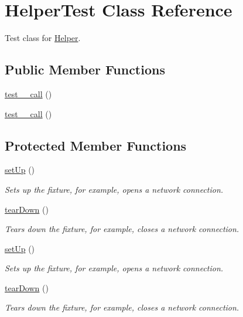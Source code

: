 \hypertarget{class_helper_test}{
\section{HelperTest Class Reference}
\label{class_helper_test}
}


Test class for \hyperlink{class_helper}{Helper}.  


\subsection*{Public Member Functions}
\begin{DoxyCompactItemize}
\item 
\hyperlink{class_helper_test_ac255e382d28a8cf0fe6fe6b572c215bb}{test\_\-\_\-call} ()
\item 
\hyperlink{class_helper_test_ac255e382d28a8cf0fe6fe6b572c215bb}{test\_\-\_\-call} ()
\end{DoxyCompactItemize}
\subsection*{Protected Member Functions}
\begin{DoxyCompactItemize}
\item 
\hyperlink{class_helper_test_ae5dbcf64c5f0e91ac7286f6615a1fbde}{setUp} ()
\begin{DoxyCompactList}\small\item\em Sets up the fixture, for example, opens a network connection. \item\end{DoxyCompactList}\item 
\hyperlink{class_helper_test_a9b57fe954d29dc0a6385e4c7f9f7d42a}{tearDown} ()
\begin{DoxyCompactList}\small\item\em Tears down the fixture, for example, closes a network connection. \item\end{DoxyCompactList}\item 
\hyperlink{class_helper_test_ae5dbcf64c5f0e91ac7286f6615a1fbde}{setUp} ()
\begin{DoxyCompactList}\small\item\em Sets up the fixture, for example, opens a network connection. \item\end{DoxyCompactList}\item 
\hyperlink{class_helper_test_a9b57fe954d29dc0a6385e4c7f9f7d42a}{tearDown} ()
\begin{DoxyCompactList}\small\item\em Tears down the fixture, for example, closes a network connection. \item\end{DoxyCompactList}\end{DoxyCompactItemize}

